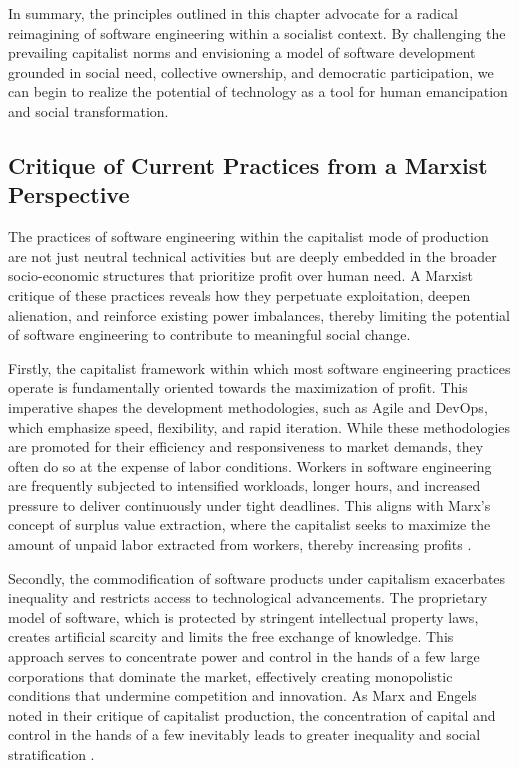 \begin{refsection}
In summary, the principles outlined in this chapter advocate for a radical reimagining of software engineering within a socialist context. By challenging the prevailing capitalist norms and envisioning a model of software development grounded in social need, collective ownership, and democratic participation, we can begin to realize the potential of technology as a tool for human emancipation and social transformation.

\subsection{Critique of Current Practices from a Marxist Perspective}

The practices of software engineering within the capitalist mode of production are not just neutral technical activities but are deeply embedded in the broader socio-economic structures that prioritize profit over human need. A Marxist critique of these practices reveals how they perpetuate exploitation, deepen alienation, and reinforce existing power imbalances, thereby limiting the potential of software engineering to contribute to meaningful social change.

Firstly, the capitalist framework within which most software engineering practices operate is fundamentally oriented towards the maximization of profit. This imperative shapes the development methodologies, such as Agile and DevOps, which emphasize speed, flexibility, and rapid iteration. While these methodologies are promoted for their efficiency and responsiveness to market demands, they often do so at the expense of labor conditions. Workers in software engineering are frequently subjected to intensified workloads, longer hours, and increased pressure to deliver continuously under tight deadlines. This aligns with Marx’s concept of surplus value extraction, where the capitalist seeks to maximize the amount of unpaid labor extracted from workers, thereby increasing profits \cite[pp.~326-334]{marxCapital2008}.

Secondly, the commodification of software products under capitalism exacerbates inequality and restricts access to technological advancements. The proprietary model of software, which is protected by stringent intellectual property laws, creates artificial scarcity and limits the free exchange of knowledge. This approach serves to concentrate power and control in the hands of a few large corporations that dominate the market, effectively creating monopolistic conditions that undermine competition and innovation. As Marx and Engels noted in their critique of capitalist production, the concentration of capital and control in the hands of a few inevitably leads to greater inequality and social stratification \cite[pp.~14-18]{marxCommunistManifesto2002}.


\end{refsection}
